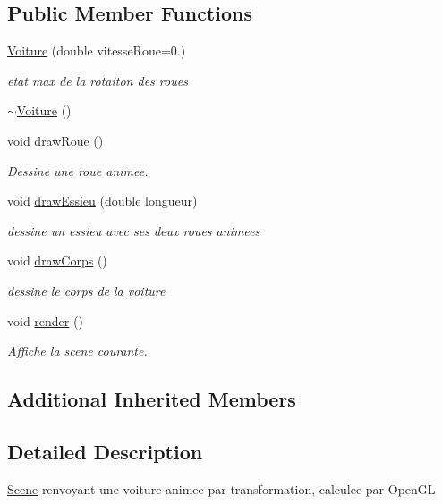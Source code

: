 \subsection*{Public Member Functions}
\begin{DoxyCompactItemize}
\item 
\hyperlink{class_voiture_a566a3faabc5c390003fa46988e5928a1}{Voiture} (double vitesse\+Roue=0.)
\begin{DoxyCompactList}\small\item\em etat max de la rotaiton des roues \end{DoxyCompactList}\item 
\hyperlink{class_voiture_afe85820a993b6908d0fdb524245e5133}{$\sim$\+Voiture} ()
\item 
void \hyperlink{class_voiture_a6232a9043c077a4f69e92b90566d9b78}{draw\+Roue} ()
\begin{DoxyCompactList}\small\item\em Dessine une roue animee. \end{DoxyCompactList}\item 
void \hyperlink{class_voiture_ab94ee125473d3b3d2b017e83e8be6f3f}{draw\+Essieu} (double longueur)
\begin{DoxyCompactList}\small\item\em dessine un essieu avec ses deux roues animees \end{DoxyCompactList}\item 
void \hyperlink{class_voiture_a7fa87c8502621808711285bf09c4b82e}{draw\+Corps} ()
\begin{DoxyCompactList}\small\item\em dessine le corps de la voiture \end{DoxyCompactList}\item 
void \hyperlink{class_voiture_a4abe5b41fc48c9cbdd0da7780dcd9a53}{render} ()
\begin{DoxyCompactList}\small\item\em Affiche la scene courante. \end{DoxyCompactList}\end{DoxyCompactItemize}
\subsection*{Additional Inherited Members}


\subsection{Detailed Description}
\hyperlink{class_scene}{Scene} renvoyant une voiture animee par transformation, calculee par Open\+G\+L 

